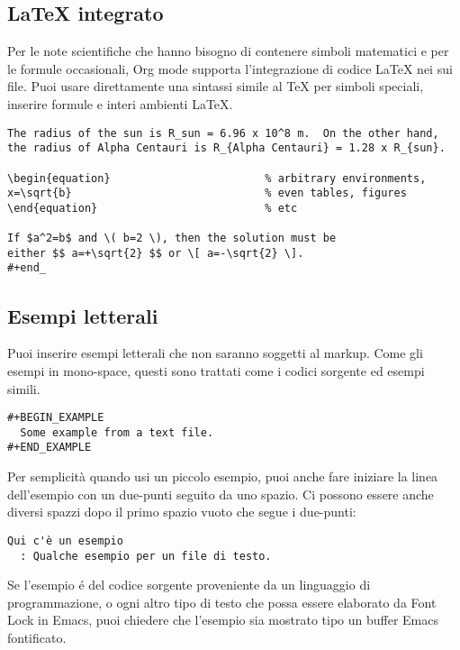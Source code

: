 \documentclass[11pt]{article}
\begin{document}
\subsection{\LaTeX{} integrato}
\label{sec:org1b94f36}
Per le note scientifiche che hanno bisogno di contenere simboli
matematici e per le formule occasionali, Org mode supporta
l'integrazione di codice \LaTeX{} nei sui file. Puoi usare direttamente
una sintassi simile al \TeX{} per simboli speciali, inserire formule e
interi ambienti \LaTeX{}.

\begin{verbatim}
The radius of the sun is R_sun = 6.96 x 10^8 m.  On the other hand,
the radius of Alpha Centauri is R_{Alpha Centauri} = 1.28 x R_{sun}.

\begin{equation}                        % arbitrary environments,
x=\sqrt{b}                              % even tables, figures
\end{equation}                          % etc

If $a^2=b$ and \( b=2 \), then the solution must be
either $$ a=+\sqrt{2} $$ or \[ a=-\sqrt{2} \].
#+end_
\end{verbatim}

\subsection{Esempi letterali}
\label{sec:orgf3bc3a6}
Puoi inserire esempi letterali che non saranno soggetti al
markup. Come gli esempi in mono-space, questi sono trattati come i
codici sorgente ed esempi simili.

\begin{verbatim}
#+BEGIN_EXAMPLE
  Some example from a text file.
#+END_EXAMPLE
\end{verbatim}

Per semplicità quando usi un piccolo esempio, puoi anche fare iniziare
la linea dell'esempio con un due-punti seguito da uno spazio. Ci
possono essere anche diversi spazzi dopo il primo spazio vuoto che
segue i due-punti:

\begin{verbatim}
Qui c'è un esempio
  : Qualche esempio per un file di testo.
\end{verbatim}

Se l'esempio é del codice sorgente proveniente da un linguaggio di
programmazione, o ogni altro tipo di testo che possa essere elaborato
da Font Lock in Emacs, puoi chiedere che l'esempio sia mostrato tipo
un buffer Emacs fontificato.
\end{document}

